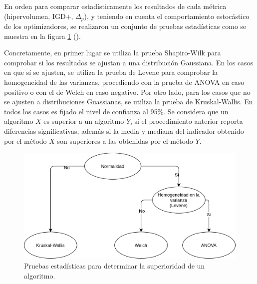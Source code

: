 %
En orden para comparar estadísticamente los resultados de cada métrica (hipervolumen, IGD+, $\Delta_p$), y teniendo en cuenta el comportamiento estocástico de los optimizadores, se realizaron un conjunto de pruebas estadísticas como se muestra en la figura \ref{fig:Tests} (\cite{Joel:StatisticalTest}). 
%

Concretamente, en primer lugar se utiliza la prueba Shapiro-Wilk para comprobar si los resultados se ajustan a una distribución Gaussiana. 
%
En los casos en que sí se ajusten, se utiliza la prueba de Levene para comprobar la homogeneidad de las varianzas, procediendo con la prueba de ANOVA en caso positivo o con el de Welch en caso negativo.
%
Por otro lado, para los casos que no se ajusten a distribuciones Guassianas, se utiliza la prueba de Kruskal-Wallis.
%
En todos los casos es fijado el nivel de confianza al 95\%.
%
Se considera que un algoritmo $X$ es superior a un algoritmo $Y$, si el procedimiento anterior reporta diferencias significativas, además si la media y mediana del indicador obtenido por el método $X$ son superiores a las obtenidas por el método $Y$.
\begin{figure}[H]
\centering
\scriptsize
\includegraphics[scale=0.2]
{Figures_Chapter6/Tests.png}
\caption{Pruebas estadísticas para determinar la superioridad de un algoritmo.}
\label{fig:Tests}
\end{figure}


